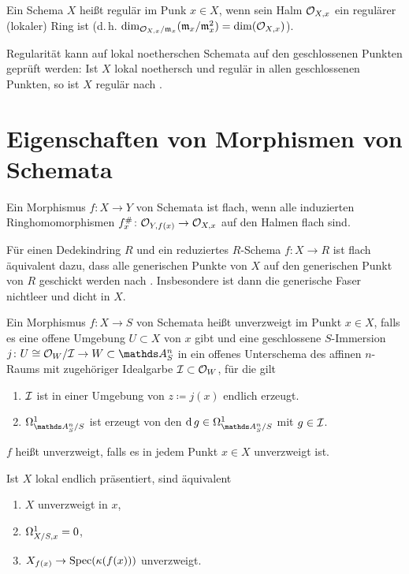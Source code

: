 \documentclass[german]{scrreprt}
\begin{document}
\begin{Definition}[Regulär]
  Ein Schema $X$ heißt regulär im Punk $x\in X$, wenn sein Halm
  $\mathcal{O}_{X,x}$ ein regulärer (lokaler) Ring ist
  (d.\,h. $\dim_{\mathcal{O}_{X,x}/\mathfrak{m}_x}(\mathfrak{m}_x/\mathfrak{m}_x^2)=\dim(\mathcal{O}_{X,x})$).

  Regularität kann auf lokal noetherschen Schemata auf den geschlossenen
  Punkten geprüft werden:
  Ist $X$ lokal noethersch und regulär in allen geschlossenen Punkten,
  so ist $X$ regulär nach \cite[Remark 6.25 (3)]{wedhorn}.
\end{Definition}

\section{Eigenschaften von Morphismen von Schemata}
\begin{Definition}
  Ein Morphismus $f\colon X\to Y$ von Schemata ist flach, wenn alle
  induzierten Ringhomomorphismen $f_x^\#\colon \mathcal{O}_{Y,f(x)}\to\mathcal{O}_{X,x}$  auf
  den Halmen flach sind.
\end{Definition}
\begin{Bemerkung}\label{thm:flachgenerischefaser}
  Für einen Dedekindring $R$ und ein reduziertes $R$-Schema $f\colon
  X\to R$ ist flach äquivalent dazu, dass alle generischen Punkte von 
  $X$ auf den generischen Punkt von $R$ geschickt werden
  nach \cite[Proposition III.9.7]{hartshorne}.
  Insbesondere ist dann die generische Faser nichtleer und dicht in $X$.
\end{Bemerkung}

\begin{Definition}
  Ein Morphismus $f\colon X\to S$ von Schemata heißt unverzweigt im
  Punkt $x\in X$, falls es eine offene Umgebung
  $U\subset X$ von $x$ gibt und eine geschlossene $S$-Immersion
  $j\colon U\cong\O_W/\I\to W\subset\A_S^n$ in ein offenes Unterschema
  des affinen $n$-Raums mit zugehöriger Idealgarbe $\mathcal{I}\subset\mathcal{O}_W$,
  für die gilt
  \begin{enumerate}[label=(\alph*)]
  \item $\mathcal{I}$ ist in einer Umgebung von $z\coloneqq j(x)$ endlich erzeugt.
  \item $\Om{\A_S^n/S}$ ist erzeugt von den $\d g\in\Om{\A_S^n/S}$
    mit $g\in\mathcal{I}$.
  \end{enumerate}
  $f$ heißt unverzweigt, falls es in jedem Punkt $x\in X$
  unverzweigt ist.
  \begin{Bemerkung}
    Ist $X$ lokal endlich präsentiert, sind äquivalent
    \begin{enumerate}[label=(\roman*)]
    \item $X$ unverzweigt in $x$,
    \item $\Omega_{X/S,x}^1=0$,
    \item $X_{f(x)}\to \operatorname{Spec}(\kappa(f(x)))$ unverzweigt.
    \end{enumerate}
  \end{Bemerkung}
\end{Definition}
\end{document}
